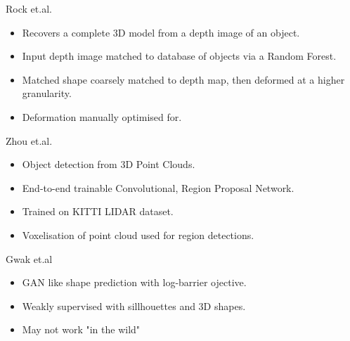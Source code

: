 Rock et.al. \cite{Rock2015}
\begin{itemize}
	\item Recovers a complete 3D model from a depth image of an object.
	\item Input depth image matched to database of objects via a Random Forest.
	\item Matched shape coarsely matched to depth map, then deformed at a higher granularity.
	\item Deformation manually optimised for.
\end{itemize}

Zhou et.al. \cite{Zhou2017_2}
\begin{itemize}
	\item Object detection from 3D Point Clouds.
	\item End-to-end trainable Convolutional, Region Proposal Network.
	\item Trained on KITTI LIDAR dataset. \cite{Geiger2013}
	\item Voxelisation of point cloud used for region detections.
\end{itemize}

Gwak et.al \cite{Gwak2017}
\begin{itemize}
	\item GAN like shape prediction with log-barrier ojective.
	\item Weakly supervised with sillhouettes and 3D shapes.
	\item May not work "in the wild"
\end{itemize}

